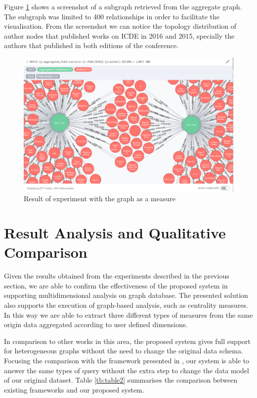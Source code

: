 Figure \ref{fig:figure37} shows a screenshot of a subgraph retrieved from the aggregate graph. The subgraph was limited to 400 relationships in order to facilitate the visualisation. From the screenshot we can notice the topology distribution of author nodes that published works on ICDE in 2016 and 2015, specially the authors that published in both editions of the conference.

\begin{figure}[!h]
\centering
\includegraphics[width=1\textwidth]{../graph_measure.png}
\caption{Result of experiment with the graph as a measure}
\label{fig:figure37}
\end{figure}

\section{Result Analysis and Qualitative Comparison}
Given the results obtained from the experiments described in the previous section, we are able to confirm the effectiveness of the proposed system in supporting multidimensional analysis on graph database. The presented solution also supports the execution of graph-based analysis, such as centrality measures. In this way we are able to extract three different types of measures from the same origin data aggregated according to user defined dimensions.

In comparison to other works in this area, the proposed system gives full support for heterogeneous graphs without the need to change the original data schema. Focusing the comparison with the framework presented in \cite{Ghrab2013}, our system is able to answer the same types of query without the extra step to change the data model of our original dataset. Table \ref{tb:table2} summarises the comparison between existing frameworks and our proposed system.

